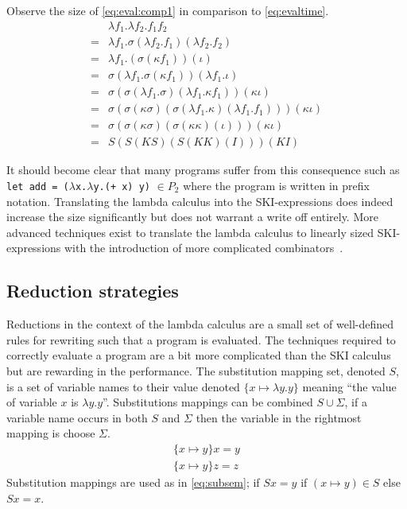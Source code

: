 \documentclass[11pt,oneside,a4paper]{report}
\begin{document}
\begin{exmp}
    Observe the size of \autoref{eq:eval:comp1} in comparison to \autoref{eq:evaltime}.
\begin{align}
    &\lambda f_1 . \lambda f_2 . f_1 f_2 \label{eq:eval:comp1}\\
    =&\lambda f_1 . \sigma(\lambda f_2 . f_1)(\lambda f_2 . f_2) \tag*{} \\
    =&\lambda f_1 . (\sigma(\kappa f_1))(\iota) \tag*{} \\
    =&\sigma (\lambda f_1 . \sigma (\kappa f_1)) (\lambda f_1 . \iota) \tag*{} \\
    =&\sigma (\sigma (\lambda f_1 . \sigma) (\lambda f_1 . \kappa f_1)) (\kappa \iota) \tag*{} \\
    =&\sigma (\sigma (\kappa \sigma) (\sigma (\lambda f_1 . \kappa) (\lambda f_1 . f_1))) (\kappa \iota) \tag*{} \\
    =&\sigma (\sigma (\kappa \sigma) (\sigma (\kappa \kappa) (\iota))) (\kappa \iota) \tag*{} \\
    =&S (S (K S) (S (K K) (I))) (K I) \tag*{}
\end{align}
\end{exmp}
It should become clear that many programs suffer from this consequence such as \texttt{let add = ($\lambda$x.$\lambda$y.(+ x) y)} $\in P_2$ where the program is written in prefix notation.
Translating the lambda calculus into the SKI-expressions does indeed increase the size significantly but does not warrant a write off entirely.
More advanced techniques exist to translate the lambda calculus to linearly sized SKI-expressions with the introduction of more complicated combinators~\cite{kiselyov2018lambda}.

\subsection{Reduction strategies}
Reductions in the context of the lambda calculus are a small set of well-defined rules for rewriting such that a program is evaluated.
The techniques required to correctly evaluate a program are a bit more complicated than the SKI calculus but are rewarding in the performance.
The substitution mapping set, denoted $S$, is a set of variable names to their value denoted $\{ x \mapsto \lambda y . y \}$ meaning ``the value of variable $x$ is $\lambda y . y$''.
Substitutions mappings can be combined $S \cup \Sigma$, if a variable name occurs in both $S$ and $\Sigma$ then the variable in the rightmost mapping is choose $\Sigma$.
\begin{align}
  \{ x \mapsto y \} x = y\label{eq:subsem}\\
  \{ x \mapsto y \} z = z \tag*{}
\end{align}
Substitution mappings are used as in \autoref{eq:subsem}; if $Sx = y$ if $(x \mapsto y) \in S$ else $Sx = x$.
\end{document}
